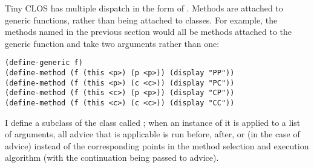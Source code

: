 \documentclass[12pt]{article}
\begin{document}
Tiny CLOS has multiple dispatch in the form of .  Methods are attached to generic functions, rather than
being attached to classes.  For example, the methods named  in 
the previous section would all be methods attached to the generic
function  and take two arguments rather than one:
\begin{verbatim}
(define-generic f)
(define-method (f (this <p>) (p <p>)) (display "PP"))
(define-method (f (this <p>) (c <c>)) (display "PC"))
(define-method (f (this <c>) (p <p>)) (display "CP"))
(define-method (f (this <c>) (c <c>)) (display "CC"))
\end{verbatim}
I define a subclass of the class  called
; when an instance of it is applied to a
list of arguments, all advice that is applicable is run before, after,
or (in the case of  advice) instead of the corresponding
points in the method selection and execution algorithm (with the
continuation being passed to  advice).
\end{document}

